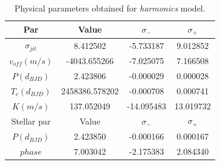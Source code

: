 \documentclass[a4paper,11pt,twocolumn]{article}
\begin{document}
\begin{table}[h!]
	\centering
	\begin{tabular}{cccc}
		\hline
		Par& Value & $\sigma_{-}$ & $\sigma_{+}$\\
		\hline
		$\sigma_{jit}$ &            8.412502 &        -5.733187  &       9.012852 \\
		$v_{off} (m/s)$ &         -4043.655266 &        -7.025075 &        7.166508 \\
		$P (d_{BJD})$   &2.423806       & -0.000029    &      0.000028   \\
		$T_c (d_{BJD})$  &2458386.578202  & -0.000708   &      0.000741  \\
		$K (m/s)$   &137.052049      & -14.095483  &      13.019732\\
		\hline
		Stellar par& Value & $\sigma_{-}$ & $\sigma_{+}$\\
		\hline
		$P (d_{BJD})$ &            2.423850 &        -0.000166   &       0.000167 \\
		$phase$ &         7.003042  &        -2.175383 &        2.084340  \\
		\hline
	\end{tabular} 
	\caption{Physical parameters obtained for \textit{harmonics} model.}
\end{table}
\end{document}
